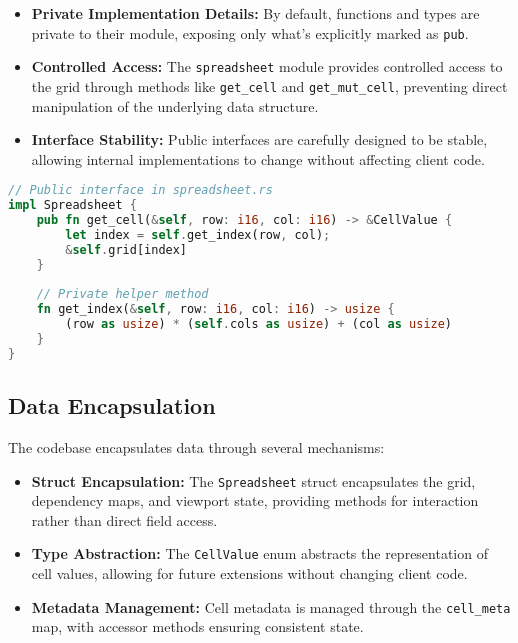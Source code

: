 \documentclass[11pt,a4paper]{article}
\begin{document}
\begin{itemize}
  \item \textbf{Private Implementation Details:} By default, functions and types are private to their module, exposing only what's explicitly marked as \lstinline{pub}.
  
  \item \textbf{Controlled Access:} The \lstinline{spreadsheet} module provides controlled access to the grid through methods like \lstinline{get_cell} and \lstinline{get_mut_cell}, preventing direct manipulation of the underlying data structure.
  
  \item \textbf{Interface Stability:} Public interfaces are carefully designed to be stable, allowing internal implementations to change without affecting client code.
\end{itemize}

\begin{lstlisting}[language=Rust, caption={Module-level encapsulation example}, label=lst:module-encap]
// Public interface in spreadsheet.rs
impl Spreadsheet {
    pub fn get_cell(&self, row: i16, col: i16) -> &CellValue {
        let index = self.get_index(row, col);
        &self.grid[index]
    }
    
    // Private helper method
    fn get_index(&self, row: i16, col: i16) -> usize {
        (row as usize) * (self.cols as usize) + (col as usize)
    }
}
\end{lstlisting}

\subsection{Data Encapsulation}

The codebase encapsulates data through several mechanisms:

\begin{itemize}
  \item \textbf{Struct Encapsulation:} The \lstinline{Spreadsheet} struct encapsulates the grid, dependency maps, and viewport state, providing methods for interaction rather than direct field access.
  
  \item \textbf{Type Abstraction:} The \lstinline{CellValue} enum abstracts the representation of cell values, allowing for future extensions without changing client code.
  
  \item \textbf{Metadata Management:} Cell metadata is managed through the \lstinline{cell_meta} map, with accessor methods ensuring consistent state.
\end{itemize}
\end{document}

